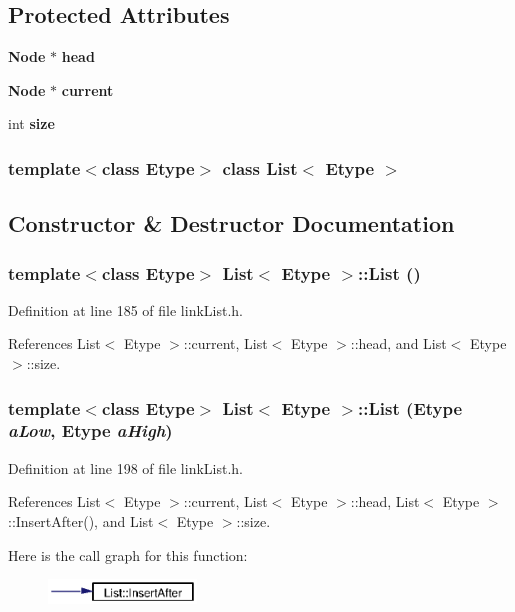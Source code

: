 \subsection*{Protected Attributes}
\begin{CompactItemize}
\item 
{\bf Node} $\ast$ {\bf head}
\item 
{\bf Node} $\ast$ {\bf current}
\item 
int {\bf size}
\end{CompactItemize}
\subsubsection*{template$<$class Etype$>$ class List$<$ Etype $>$}



\subsection{Constructor \& Destructor Documentation}
\subsubsection{\setlength{\rightskip}{0pt plus 5cm}template$<$class Etype$>$ {\bf List}$<$ Etype $>$::{\bf List} ()}\label{classList_a0}




Definition at line 185 of file link\-List.h.

References List$<$ Etype $>$::current, List$<$ Etype $>$::head, and List$<$ Etype $>$::size.
\subsubsection{\setlength{\rightskip}{0pt plus 5cm}template$<$class Etype$>$ {\bf List}$<$ Etype $>$::{\bf List} (Etype {\em a\-Low}, Etype {\em a\-High})}\label{classList_a1}




Definition at line 198 of file link\-List.h.

References List$<$ Etype $>$::current, List$<$ Etype $>$::head, List$<$ Etype $>$::Insert\-After(), and List$<$ Etype $>$::size.

Here is the call graph for this function:\begin{figure}[H]
\begin{center}
\leavevmode
\includegraphics[width=112pt]{classList_a1_cgraph}
\end{center}
\end{figure}
